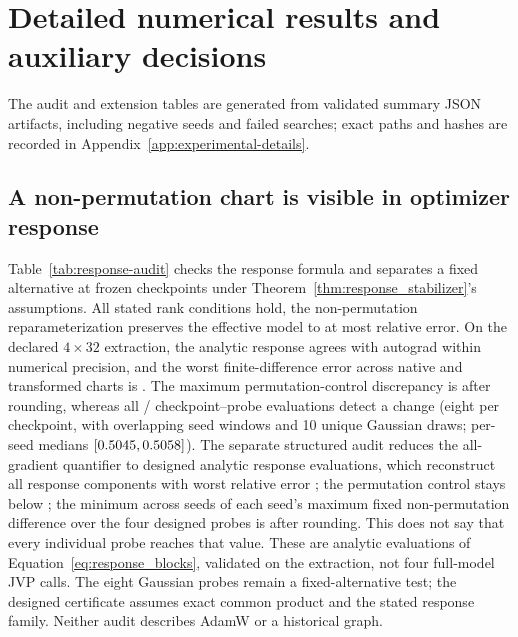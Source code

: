 \section{Detailed numerical results and auxiliary decisions}
\label{app:detailed-results}

The audit and extension tables are generated from validated summary JSON artifacts,
including negative seeds and failed searches; exact paths and hashes are
recorded in Appendix~\ref{app:experimental-details}.

\subsection{A non-permutation chart is visible in optimizer response}



Table~\ref{tab:response-audit} checks the response formula and separates
a fixed alternative at frozen checkpoints under
Theorem~\ref{thm:response_stabilizer}'s assumptions.  All stated rank conditions hold, the
non-permutation reparameterization preserves the effective model to at most
\ResponseEffectiveMax{} relative error.  On the declared $4\times32$
extraction, the analytic response agrees with autograd within numerical
precision, and the worst finite-difference error across native and transformed
charts is \ResponseFormulaMax{}.  The maximum permutation-control discrepancy
is \ResponsePermutationMax{} after rounding, whereas all
\ResponseProbeDetected{}/\ResponseProbeExpected{} checkpoint--probe
evaluations detect a change (eight per checkpoint, with overlapping seed
windows and 10 unique Gaussian draws; per-seed medians
$[0.5045{},0.5058{}]$).
The separate structured audit reduces the all-gradient quantifier to
\ResponseTomographyProbeCount{} designed analytic response evaluations, which
reconstruct all response components with worst relative error
\ResponseTomographyReconstructionMax{}; the
permutation control stays below \ResponseTomographyPermutationMax{}; the
minimum across seeds of each seed's maximum fixed non-permutation difference
over the four designed probes is \ResponseTomographyNonpermutationMin{} after
rounding.  This does not say that every individual probe reaches that value.
These are analytic evaluations of
Equation~\ref{eq:response_blocks}, validated on the extraction, not four
full-model JVP calls.  The eight Gaussian probes remain a fixed-alternative
test; the designed certificate assumes exact common product and the stated
response family.  Neither audit describes AdamW or a historical graph.

